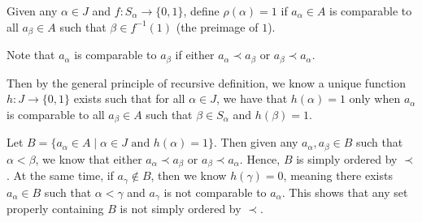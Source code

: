 \documentclass{book}
\newcommand{\myComment}{%
   \color{RawerSienna}%
   \fontsize{12}{14}\selectfont%
}
\newenvironment{myIndent}{%
   \begin{adjustwidth}{2.5em}{0em}%
}{%
   \end{adjustwidth}%
}
\newenvironment{myTindent}{%
   \begin{adjustwidth}{7.5em}{0em}%
}{%
   \end{adjustwidth}%
}
\newcommand{\retTwo}{\hfill\bigbreak}
\begin{document}
\begin{myIndent}
      Given any $\alpha \in J$ and $f: S_\alpha \longrightarrow \{0, 1\}$, define $\rho(\alpha) = 1$ if $a_\alpha \in A$ is comparable to all $a_\beta \in A$ such that $\beta \in f^{-1}(1)$ (the preimage of $1$).
      \begin{myTindent}\myComment
         Note that $a_\alpha$ is comparable to $a_\beta$ if either $a_\alpha \prec a_\beta$ or $a_\beta \prec a_\alpha$.\newpage
      \end{myTindent}

      Then by the general principle of recursive definition, we know a unique function $h: J \longrightarrow \{0, 1\}$ exists such that for all $\alpha \in J$, we have that $h(\alpha) = 1$ only when $a_\alpha$ is comparable to all $a_\beta \in A$ such that $\beta \in S_\alpha$ and $h(\beta) = 1$.\retTwo

      Let $B = \{a_\alpha \in A \mid \alpha \in J \text{ and } h(\alpha) = 1\}$. Then given any $a_\alpha, a_\beta \in B$ such that $\alpha < \beta$, we know that either $a_\alpha \prec a_\beta$ or $a_\beta \prec a_\alpha$. Hence, $B$ is simply ordered by $\prec$. At the same time, if $a_\gamma \notin B$, then we know $h(\gamma) = 0$, meaning there exists $a_\alpha \in B$ such that $\alpha < \gamma$ and  $a_\gamma$ is not comparable to $a_\alpha$. This shows that any set properly containing $B$ is not simply ordered by $\prec$.

   \end{myIndent}

   \newpage
\end{document}
